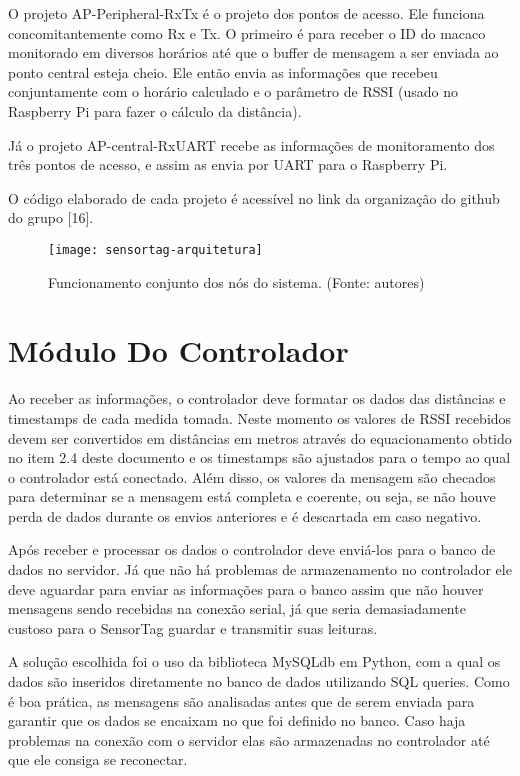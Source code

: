 O projeto AP-Peripheral-RxTx é o projeto dos pontos de acesso. Ele funciona concomitantemente como Rx e Tx. O primeiro é para receber o ID do macaco monitorado em diversos horários até que o buffer de mensagem a ser enviada ao ponto central esteja cheio. Ele então envia as informações que recebeu conjuntamente com o horário calculado e o parâmetro de RSSI (usado no Raspberry Pi para fazer o cálculo da distância). 

Já o projeto AP-central-RxUART recebe as informações de monitoramento dos três pontos de acesso, e assim as envia por UART para o Raspberry Pi. 

O código elaborado de cada projeto é acessível no link da organização do github do grupo [16].

\begin{figure}[ht]
  \centering
    \texttt{[image: sensortag-arquitetura]}
  \caption{ Funcionamento conjunto dos nós do sistema. (Fonte: autores)}
\end{figure}
\FloatBarrier 

\section{Módulo Do Controlador}

Ao receber as informações, o controlador deve formatar os dados das distâncias e timestamps de cada medida tomada. Neste momento os valores de RSSI recebidos devem ser convertidos em distâncias em metros através do equacionamento obtido no item 2.4 deste documento e os timestamps são ajustados para o tempo ao qual o controlador está conectado. Além disso, os valores da mensagem são checados para determinar se a mensagem está completa e coerente, ou seja, se não houve perda de dados durante os envios anteriores e é descartada em caso negativo.

Após receber e processar os dados o controlador deve enviá-los para o banco de dados no servidor. Já que não há problemas de armazenamento no controlador ele deve aguardar para enviar as informações para o banco assim que não houver mensagens sendo recebidas na conexão serial, já que seria demasiadamente custoso para o SensorTag guardar e transmitir suas leituras.

A solução escolhida foi o uso da biblioteca MySQLdb em Python, com a qual os dados são inseridos diretamente no banco de dados utilizando SQL queries. Como é boa prática, as mensagens são analisadas antes que de serem enviada para garantir que os dados se encaixam no que foi definido no banco. Caso haja problemas na conexão com o servidor elas são armazenadas no controlador até que ele consiga se reconectar.

